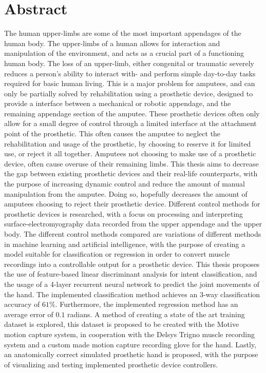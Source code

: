\documentclass[../main.tex]{subfiles}
\begin{document}
\section*{Abstract}

The human upper-limbs are some of the most important appendages of the human body.
The upper-limbs of a human allows for interaction and manipulation of the environment, and acts as a crucial part of a functioning human body.
The loss of an upper-limb, either congenital or traumatic severely reduces a person's ability to interact with- and perform simple day-to-day tasks
required for basic human living.
This is a major problem for amputees, and can only be partially solved by rehabilitation using a prosthetic device, designed to provide a interface between a mechanical or robotic appendage, and the remaining appendage section of the amputee.
These prosthetic devices often only allow for a small degree of control through a limited interface at the attachment point of the prosthetic.
This often causes the amputee to neglect the rehabilitation and usage of the prosthetic, by choosing to reserve it for limited use, or reject it all together.
Amputees not choosing to make use of a prosthetic device, often cause overuse of their remaining limbs.
This thesis aims to decrease the gap between existing prosthetic devices and their real-life counterparts, with the purpose of increasing dynamic control and reduce the amount of manual manipulation from the amputee.
Doing so, hopefully decreases the amount of amputees choosing to reject their prosthetic device. 
Different control methods for prosthetic devices is researched, with a focus on processing and interpreting surface-electromyography data recorded from the upper appendage and the upper body.
The different control methods compared are variations of different methods in machine learning and artificial intelligence, with the purpose of creating a model suitable for classification or regression in order to convert muscle recordings into a controllable output for a prosthetic device.
This thesis proposes the use of feature-based linear discriminant analysis for intent classification, and the usage of a 4-layer recurrent neural network to predict the joint movements of the hand.
The implemented classification method achieves an 3-way classification accuracy of $61\%$.
Furthermore, the implemented regression method has an average error of $0.1$ radians.
A method of creating a state of the art training dataset is explored, this dataset is proposed to be created with the Motive motion capture system, in cooperation with the Delsys Trigno muscle recording system and a custom made motion capture recording glove for the
hand.
Lastly, an anatomically correct simulated prosthetic hand is proposed, with the purpose of visualizing and testing implemented prosthetic device controllers.

\end{document}
